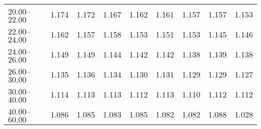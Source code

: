 \begin{table}[htp]
\begin{tiny}
\begin{center}
\begin{tabular}{|l|c|c|c|c|c|c|c|c|}
$20.00$--$22.00$ & 1.174 & 1.172 & 1.167 & 1.162 & 1.161 & 1.157 & 1.157 & 1.153  \\
$22.00$--$24.00$ & 1.162 & 1.157 & 1.158 & 1.153 & 1.151 & 1.153 & 1.145 & 1.146  \\
$24.00$--$26.00$ & 1.149 & 1.149 & 1.144 & 1.142 & 1.142 & 1.138 & 1.139 & 1.138  \\
$26.00$--$30.00$ & 1.135 & 1.136 & 1.134 & 1.130 & 1.131 & 1.129 & 1.129 & 1.127  \\
$30.00$--$40.00$ & 1.114 & 1.113 & 1.113 & 1.112 & 1.113 & 1.110 & 1.112 & 1.112  \\
$40.00$--$60.00$ & 1.086 & 1.085 & 1.083 & 1.085 & 1.082 & 1.082 & 1.088 & 1.028  \\
\hline
\end{tabular} 
             \end{center} 
             \end{tiny} 
             \label{tab:sa_trpm_psi2s} 
             \end{table}


